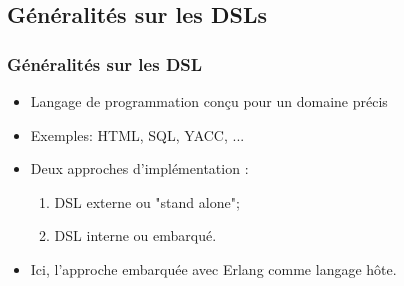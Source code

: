 \documentclass[10pt]{beamer}
\begin{document}
\subsection{Généralités sur les DSLs}
\begin{frame}
\frametitle{Généralités sur les DSL}

\begin{itemize}
       \item Langage de programmation conçu pour un domaine précis
	\item Exemples: HTML, SQL, YACC, ...
      \end{itemize}
\begin{itemize}
 \item Deux approches d'implémentation \cite{dsloverview}:
      \begin{enumerate}
      \item DSL externe ou "stand alone";
      \item DSL interne ou embarqué.
      \end{enumerate}
 \item Ici, l'approche embarquée avec Erlang comme langage hôte.
\end{itemize}
\end{frame}
\end{document}
